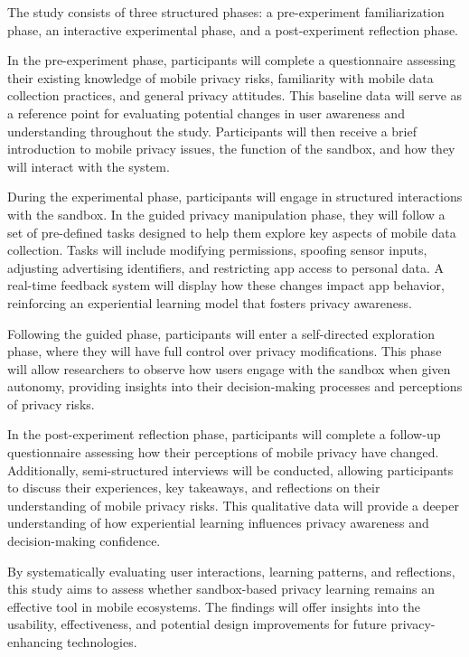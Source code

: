 \documentclass[acmlarge, nonacm]{acmart}
\begin{document}
The study consists of three structured phases: a pre-experiment familiarization phase, an interactive experimental phase, and a post-experiment reflection phase.

In the pre-experiment phase, participants will complete a questionnaire assessing their existing knowledge of mobile privacy risks, familiarity with mobile data collection practices, and general privacy attitudes. This baseline data will serve as a reference point for evaluating potential changes in user awareness and understanding throughout the study. Participants will then receive a brief introduction to mobile privacy issues, the function of the sandbox, and how they will interact with the system.

During the experimental phase, participants will engage in structured interactions with the sandbox. In the guided privacy manipulation phase, they will follow a set of pre-defined tasks designed to help them explore key aspects of mobile data collection. Tasks will include modifying permissions, spoofing sensor inputs, adjusting advertising identifiers, and restricting app access to personal data. A real-time feedback system will display how these changes impact app behavior, reinforcing an experiential learning model that fosters privacy awareness.

Following the guided phase, participants will enter a self-directed exploration phase, where they will have full control over privacy modifications. This phase will allow researchers to observe how users engage with the sandbox when given autonomy, providing insights into their decision-making processes and perceptions of privacy risks.

In the post-experiment reflection phase, participants will complete a follow-up questionnaire assessing how their perceptions of mobile privacy have changed. Additionally, semi-structured interviews will be conducted, allowing participants to discuss their experiences, key takeaways, and reflections on their understanding of mobile privacy risks. This qualitative data will provide a deeper understanding of how experiential learning influences privacy awareness and decision-making confidence.

By systematically evaluating user interactions, learning patterns, and reflections, this study aims to assess whether sandbox-based privacy learning remains an effective tool in mobile ecosystems. The findings will offer insights into the usability, effectiveness, and potential design improvements for future privacy-enhancing technologies.
\end{document}
